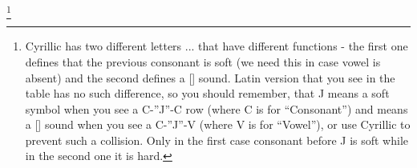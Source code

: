 \footnote{Cyrillic has two different letters ... that have different functions - the first one defines that the previous consonant is soft (we need this in case vowel is absent) and the second defines a [\textctj] sound. Latin version that you see in the table has no such difference, so you should remember, that J means a soft symbol when you see a C-”J”-C row (where C is for “Consonant”) and means a [\textctj] sound when you see a C-”J”-V (where V is for “Vowel”), or use Cyrillic to prevent such a collision. Only in the first case consonant before J is soft while in the second one it is hard.}
